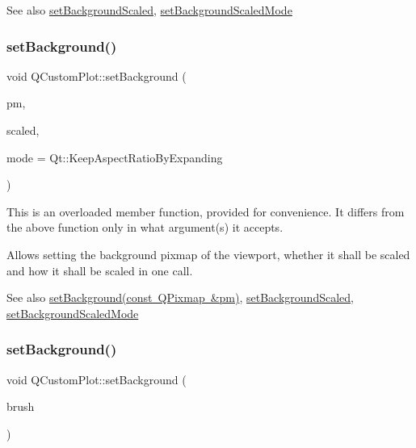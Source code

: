 \begin{DoxySeeAlso}{See also}
\mbox{\hyperlink{class_q_custom_plot_a36f0fa1317325dc7b7efea615ee2de1f}{set\+Background\+Scaled}}, \mbox{\hyperlink{class_q_custom_plot_a4c0eb4865b7949f62e1cb97db04a3de0}{set\+Background\+Scaled\+Mode}} 
\end{DoxySeeAlso}
\mbox{\label{class_q_custom_plot_a8513971d6aa24d8b0d6a68d45b542130}} 
\subsubsection{\texorpdfstring{set\+Background()}{setBackground()}\hspace{0.1cm}{\footnotesize\ttfamily [2/3]}}
{\footnotesize\ttfamily void Q\+Custom\+Plot\+::set\+Background (\begin{DoxyParamCaption}\item[{const Q\+Pixmap \&}]{pm,  }\item[{bool}]{scaled,  }\item[{Qt\+::\+Aspect\+Ratio\+Mode}]{mode = {\ttfamily Qt\+:\+:KeepAspectRatioByExpanding} }\end{DoxyParamCaption})}

This is an overloaded member function, provided for convenience. It differs from the above function only in what argument(s) it accepts.

Allows setting the background pixmap of the viewport, whether it shall be scaled and how it shall be scaled in one call.

\begin{DoxySeeAlso}{See also}
\mbox{\hyperlink{class_q_custom_plot_a130358592cfca353ff3cf5571b49fb00}{set\+Background(const Q\+Pixmap \&pm)}}, \mbox{\hyperlink{class_q_custom_plot_a36f0fa1317325dc7b7efea615ee2de1f}{set\+Background\+Scaled}}, \mbox{\hyperlink{class_q_custom_plot_a4c0eb4865b7949f62e1cb97db04a3de0}{set\+Background\+Scaled\+Mode}} 
\end{DoxySeeAlso}
\mbox{\label{class_q_custom_plot_a8ed256cf467bfa7ba1f9feaae62c3bd0}} 
\subsubsection{\texorpdfstring{set\+Background()}{setBackground()}\hspace{0.1cm}{\footnotesize\ttfamily [3/3]}}
{\footnotesize\ttfamily void Q\+Custom\+Plot\+::set\+Background (\begin{DoxyParamCaption}\item[{const Q\+Brush \&}]{brush }\end{DoxyParamCaption})}

